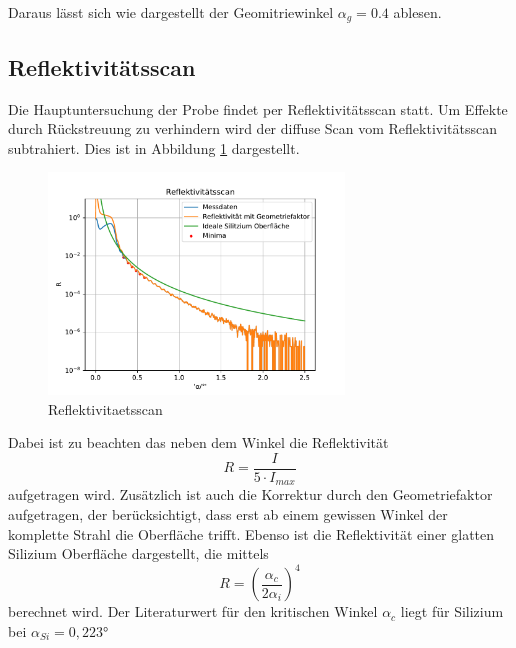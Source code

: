 Daraus lässt sich wie dargestellt der Geomitriewinkel $\alpha_g = 0.4$ ablesen.



\subsection{Reflektivitätsscan}
Die Hauptuntersuchung der Probe findet per Reflektivitätsscan statt.
Um Effekte durch Rückstreuung zu verhindern wird der diffuse Scan vom Reflektivitätsscan subtrahiert.
Dies ist in Abbildung \ref{fig:ref} dargestellt.
\begin{figure}[h]
    \centering
    \includegraphics[width = 0.7\textwidth]{Auswertung/Graphen/Reflektivitaetsscan.pdf}
    \caption{Reflektivitaetsscan}
    \label{fig:ref}
\end{figure}
Dabei ist zu beachten das neben dem Winkel die Reflektivität
\begin{equation*}
    R = \frac{I}{5\cdot I_{max}} 
\end{equation*}
aufgetragen wird.
Zusätzlich ist auch die Korrektur durch den Geometriefaktor aufgetragen,
der berücksichtigt,
dass erst ab einem gewissen Winkel der komplette Strahl die Oberfläche trifft.
Ebenso ist die Reflektivität einer glatten Silizium Oberfläche dargestellt,
die mittels
\begin{equation}
    R = \left(\frac{\alpha_c}{2\alpha_i}\right)^4
\end{equation}
berechnet wird. 
Der Literaturwert für den kritischen Winkel $\alpha_c$ liegt für Silizium bei $\alpha_{Si} = 0,223°$ \cite{wert}

